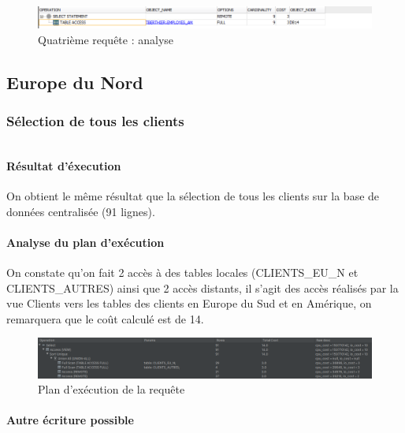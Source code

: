 \documentclass[10pt,a4paper]{article}
\theoremstyle{plain}
\begin{document}
\begin{figure}[H]
    \centering
    \includegraphics[width=15cm]{EUS_req4_analyse.PNG}
    \caption{Quatrième requête : analyse}
\end{figure}
\newpage

\subsection{Europe du Nord}

\subsubsection{Sélection de tous les clients}

\inputminted{sql}{INSA-DB12-EuropeNord-req1.sql}

\paragraph{Résultat d'éxecution}

On obtient le même résultat que la sélection de tous les clients sur la base de données centralisée (91 lignes).

\paragraph{Analyse du plan d'exécution}

On constate qu'on fait 2 accès à des tables locales (CLIENTS\_EU\_N et CLIENTS\_AUTRES) ainsi que 2 accès distants, il s'agit des accès réalisés par la vue Clients vers les tables des clients en Europe du Sud et en Amérique, on remarquera que le coût calculé est de 14.

\begin{figure}[H]
    \centering
    \includegraphics[width=15cm]{INSA-DB12-EuropeNord-plan-exec-vues-distante1.png}
    \caption{Plan d'exécution de la requête}
\end{figure}

\paragraph{Autre écriture possible}
\end{document}
